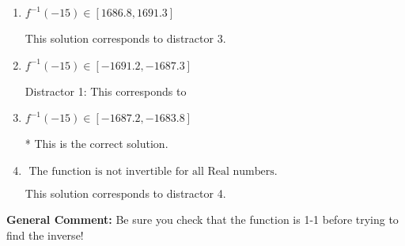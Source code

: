 \documentclass{extbook}[14pt]
\begin{document}
\begin{enumerate}
{\begin{enumerate}[label=\Alph*.]
 This solution corresponds to distractor 2.
\item \( f^{-1}(-15) \in [1686.8, 1691.3] \)

 This solution corresponds to distractor 3.
\item \( f^{-1}(-15) \in [-1691.2, -1687.3] \)

 Distractor 1: This corresponds to 
\item \( f^{-1}(-15) \in [-1687.2, -1683.8] \)

* This is the correct solution.
\item \( \text{ The function is not invertible for all Real numbers. } \)

 This solution corresponds to distractor 4.
\end{enumerate}

\textbf{General Comment:} Be sure you check that the function is 1-1 before trying to find the inverse!
}
\end{enumerate}
\end{document}
